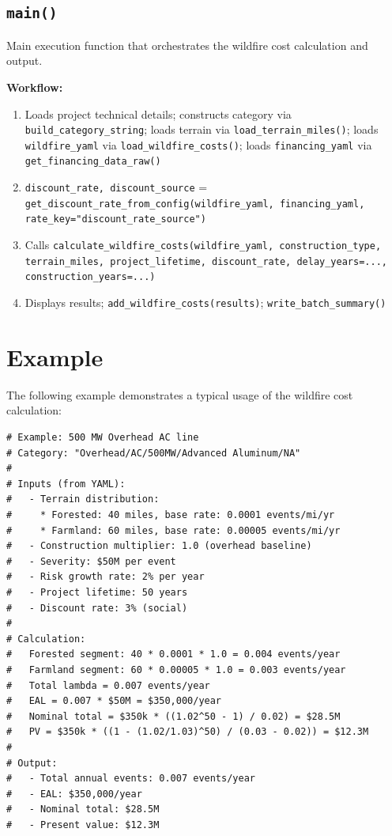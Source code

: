 \documentclass[ctcc_full_documentation.tex]{subfiles}
\begin{document}
\subsection{\texttt{main()}}

Main execution function that orchestrates the wildfire cost calculation and output.

\textbf{Workflow:}
\begin{enumerate}
    \item Loads project technical details; constructs category via \texttt{build\_category\_string}; loads terrain via \texttt{load\_terrain\_miles()}; loads \texttt{wildfire\_yaml} via \texttt{load\_wildfire\_costs()}; loads \texttt{financing\_yaml} via \texttt{get\_financing\_data\_raw()}
    \item \texttt{discount\_rate, discount\_source} = \texttt{get\_discount\_rate\_from\_config(wildfire\_yaml, financing\_yaml, rate\_key="discount\_rate\_source")}
    \item Calls \texttt{calculate\_wildfire\_costs(wildfire\_yaml, construction\_type, terrain\_miles, project\_lifetime, discount\_rate, delay\_years=..., construction\_years=...)}
    \item Displays results; \texttt{add\_wildfire\_costs(results)}; \texttt{write\_batch\_summary()}
\end{enumerate}

\section{Example}

The following example demonstrates a typical usage of the wildfire cost calculation:

\begin{lstlisting}
# Example: 500 MW Overhead AC line
# Category: "Overhead/AC/500MW/Advanced Aluminum/NA"
# 
# Inputs (from YAML):
#   - Terrain distribution:
#     * Forested: 40 miles, base rate: 0.0001 events/mi/yr
#     * Farmland: 60 miles, base rate: 0.00005 events/mi/yr
#   - Construction multiplier: 1.0 (overhead baseline)
#   - Severity: $50M per event
#   - Risk growth rate: 2% per year
#   - Project lifetime: 50 years
#   - Discount rate: 3% (social)
#
# Calculation:
#   Forested segment: 40 * 0.0001 * 1.0 = 0.004 events/year
#   Farmland segment: 60 * 0.00005 * 1.0 = 0.003 events/year
#   Total lambda = 0.007 events/year
#   EAL = 0.007 * $50M = $350,000/year
#   Nominal total = $350k * ((1.02^50 - 1) / 0.02) = $28.5M
#   PV = $350k * ((1 - (1.02/1.03)^50) / (0.03 - 0.02)) = $12.3M
#
# Output:
#   - Total annual events: 0.007 events/year
#   - EAL: $350,000/year
#   - Nominal total: $28.5M
#   - Present value: $12.3M
\end{lstlisting}
\end{document}
